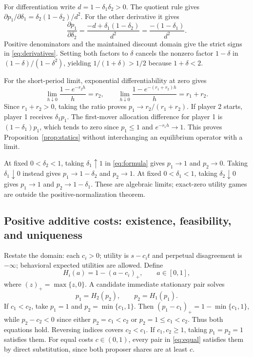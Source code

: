 \documentclass[11pt]{article}
\newcommand{\pos}[1]{\left(#1\right)_{+}}
\begin{document}
For differentiation write $d=1-\delta_1\delta_2>0$. The quotient rule gives $\partial p_1/\partial\delta_1=\delta_2(1-\delta_2)/d^2$. For the other derivative it gives
\begin{equation}
 \frac{\partial p_1}{\partial\delta_2}
 =\frac{-d+\delta_1(1-\delta_2)}{d^2}
 =\frac{-(1-\delta_1)}{d^2}.
\end{equation}
Positive denominators and the maintained discount domain give the strict signs in \eqref{eq:derivatives}. Setting both factors to $\delta$ cancels the nonzero factor $1-\delta$ in $(1-\delta)/(1-\delta^2)$, yielding $1/(1+\delta)>1/2$ because $1+\delta<2$.

For the short-period limit, exponential differentiability at zero gives
\begin{equation}
 \lim_{h\downarrow0}\frac{1-e^{-r_2h}}h=r_2,
 \qquad
 \lim_{h\downarrow0}\frac{1-e^{-(r_1+r_2)h}}h=r_1+r_2.
\end{equation}
Since $r_1+r_2>0$, taking the ratio proves $p_1\to r_2/(r_1+r_2)$. If player 2 starts, player 1 receives $\delta_1p_1$. The first-mover allocation difference for player 1 is $(1-\delta_1)p_1$, which tends to zero since $p_1\le1$ and $e^{-r_1h}\to1$. This proves Proposition~\ref{prop:statics} without interchanging an equilibrium operator with a limit.

At fixed $0<\delta_2<1$, taking $\delta_1\uparrow1$ in \eqref{eq:formula} gives $p_1\to1$ and $p_2\to0$. Taking $\delta_1\downarrow0$ instead gives $p_1\to1-\delta_2$ and $p_2\to1$. At fixed $0<\delta_1<1$, taking $\delta_2\downarrow0$ gives $p_1\to1$ and $p_2\to1-\delta_1$. These are algebraic limits; exact-zero utility games are outside the positive-normalization theorem.

\subsection{Positive additive costs: existence, feasibility, and uniqueness}\label{app:additive}
Restate the domain: each $c_i>0$; utility is $s-c_i t$ and perpetual disagreement is $-\infty$; behavioral expected utilities are allowed. Define
\begin{equation}\label{eq:addmap}
 H_i(a)=1-\pos{a-c_i},\qquad a\in[0,1],
\end{equation}
where $(z)_+=\max\{z,0\}$. A candidate immediate stationary pair solves
\begin{equation}\label{eq:addres}
 p_1=H_2(p_2),\qquad p_2=H_1(p_1).
\end{equation}
If $c_1<c_2$, take $p_1=1$ and $p_2=\min\{c_1,1\}$. Then $\pos{p_1-c_1}=1-\min\{c_1,1\}$, while $p_2-c_2<0$ since either $p_2=c_1<c_2$ or $p_2=1\le c_1<c_2$. Thus both equations hold. Reversing indices covers $c_2<c_1$. If $c_1,c_2\ge1$, taking $p_1=p_2=1$ satisfies them. For equal costs $c\in(0,1)$, every pair in \eqref{eq:equal} satisfies them by direct substitution, since both proposer shares are at least $c$.
\end{document}
